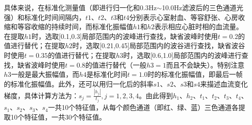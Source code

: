 \par
{具体来说，在标准化测量值（即进行归一化和0.3Hz$\sim$10.0Hz滤波后的三色通道光强）和标准化时间间隔内，$t1$、$t2$、$t3$和$t4$分别表示心室射血、等容舒张、心房收缩和等容收缩的持续时间，而标准化振幅值$h1$和$h2$表示相应心脏时相的血流量。在提取$h1$时，选取[0.1,0.3]局部范围内的波峰进行查找，缺省波峰时使用$t=0.2$的值进行替代；在提取$h2$时，选取[0.21,0.45]局部范围内的波谷进行查找，缺省波谷时使用$t=0.35$的值进行替代；在提取$h3$时，选取[0.6,1.0]局部范围内的波峰进行查找，缺省波峰时使用$t=0.8$的值进行替代（一般$h3=1$而且不会缺失）。特别注意$h3$一般是最大振幅值，而$h4$是标准化时间$t=1.0$时的标准化振幅值，即最后一帧的标准化振幅值。此外，还可以用归一化后的斜率$s1$、$s2$、$s3$和$s4$来描述血流变化梯度，具体计算方法为：$s_j=\frac{|h_j|}{t_j},j=1,2,3,4$。由此得到$h_1$、$h_2$、$t_1$、$t_2$、$t_3$、$t_4$、$s_1$、$s_2$、$s_3$、$s_4$一共10个特征值，从每个颜色通道（即红、绿、蓝）三色通道各提取10个特征值，一共30个特征值。}


